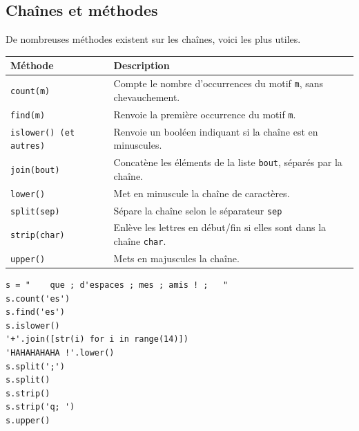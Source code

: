 \subsection{Chaînes et méthodes}
De nombreuses méthodes existent sur les chaînes, voici les plus utiles.
  \begin{center}
    \begin{tabular}{lp{8cm}}
      \hline
      \textbf{Méthode} & \textbf{Description} \\ \hline
      \texttt{count(m)}& Compte le nombre d'occurrences du motif \texttt{m}, sans chevauchement.\\
      \texttt{find(m)}& Renvoie la première occurrence du motif \texttt{m}.\\
      \texttt{islower() (et autres)}& Renvoie un booléen indiquant si la chaîne est en minuscules. \\
      \texttt{join(bout)}& Concatène les éléments de la liste \texttt{bout}, séparés par la chaîne.\\
      \texttt{lower()}& Met en minuscule la chaîne de caractères.\\
      \texttt{split(sep)}& Sépare la chaîne selon le séparateur \texttt{sep}\\
      \texttt{strip(char)}& Enlève les lettres en début/fin si elles sont dans la chaîne \texttt{char}.\\
      \texttt{upper()}& Mets en majuscules la chaîne.  \\
      \hline
    \end{tabular}
  \end{center}

\begin{lstlisting}
s = "    que ; d'espaces ; mes ; amis ! ;   "
s.count('es')
s.find('es')
s.islower()
'+'.join([str(i) for i in range(14)])
'HAHAHAHAHA !'.lower()
s.split(';')
s.split()
s.strip()
s.strip('q; ')
s.upper()
\end{lstlisting}

